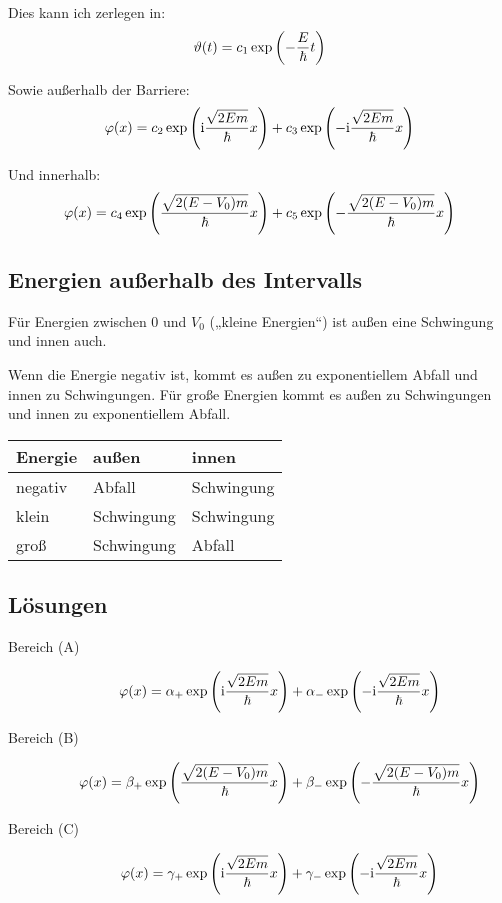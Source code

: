 Dies kann ich zerlegen in:
\[
	\vartheta(t) = c_1 \exp\del{-\frac E\hbar t}
\]

Sowie außerhalb der Barriere:
\[
	\varphi(x) = c_2 \exp\del{\ii \frac{\sqrt{2Em}}\hbar x}
	+ c_3 \exp\del{-\ii \frac{\sqrt{2Em}}\hbar x}
\]

Und innerhalb:
\[
	\varphi(x) = c_4 \exp\del{\frac{\sqrt{2(E-V_0)m}}\hbar x}
	+ c_5 \exp\del{-\frac{\sqrt{2(E-V_0)m}}\hbar x}
\]

\subsection{Energien außerhalb des Intervalls}

Für Energien zwischen 0 und $V_0$ („kleine Energien“) ist außen eine Schwingung
und innen auch.

Wenn die Energie negativ ist, kommt es außen zu exponentiellem Abfall und innen
zu Schwingungen. Für große Energien kommt es außen zu Schwingungen und innen zu
exponentiellem Abfall.

\begin{tabular}{lll}
	Energie & außen & innen \\
	\hline
	negativ & Abfall & Schwingung \\
	klein & Schwingung & Schwingung \\
	groß & Schwingung & Abfall
\end{tabular}

\subsection{Lösungen}

\begin{description}
	\item[Bereich (A)]
		\[
			\varphi(x) = \alpha_+ \exp\del{\ii \frac{\sqrt{2Em}}\hbar x}
			+ \alpha_- \exp\del{-\ii \frac{\sqrt{2Em}}\hbar x}
		\]

	\item[Bereich (B)]
		\[
			\varphi(x) = \beta_+ \exp\del{\frac{\sqrt{2(E-V_0)m}}\hbar x}
			+ \beta_- \exp\del{-\frac{\sqrt{2(E-V_0)m}}\hbar x}
		\]

	\item[Bereich (C)]
		\[
			\varphi(x) = \gamma_+ \exp\del{\ii \frac{\sqrt{2Em}}\hbar x}
			+ \gamma_- \exp\del{-\ii \frac{\sqrt{2Em}}\hbar x}
		\]
\end{description}


\IfFileExists{\bibliographyfile}{
}{}



